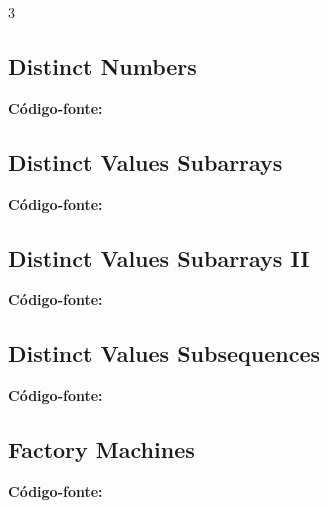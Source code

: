 \documentclass[8pt]{extarticle}
\begin{document}
\begin{multicols*}{3}
\subsection{Distinct Numbers}
\begin{caixaenunciado}

\end{caixaenunciado}
\vspace{0.3cm}
\noindent\textbf{Código-fonte:}


\subsection{Distinct Values Subarrays}
\begin{caixaenunciado}

\end{caixaenunciado}
\vspace{0.3cm}
\noindent\textbf{Código-fonte:}


\subsection{Distinct Values Subarrays II}
\begin{caixaenunciado}

\end{caixaenunciado}
\vspace{0.3cm}
\noindent\textbf{Código-fonte:}


\subsection{Distinct Values Subsequences}
\begin{caixaenunciado}

\end{caixaenunciado}
\vspace{0.3cm}
\noindent\textbf{Código-fonte:}


\subsection{Factory Machines}
\begin{caixaenunciado}

\end{caixaenunciado}
\vspace{0.3cm}
\noindent\textbf{Código-fonte:}



\end{multicols*}
\end{document}
